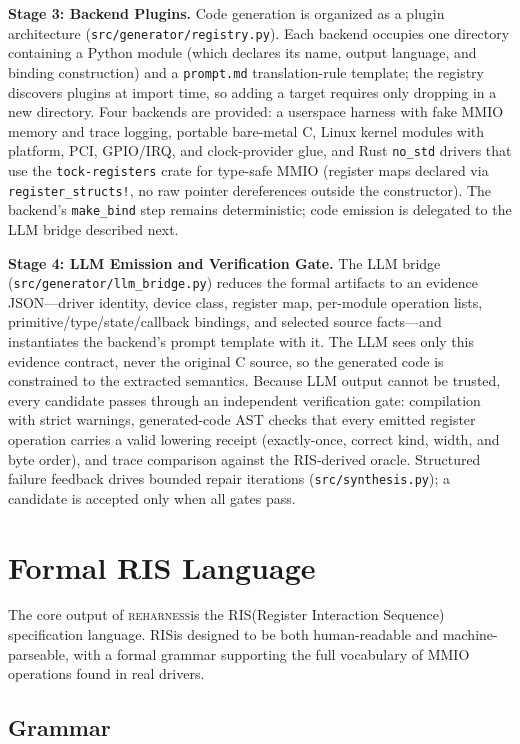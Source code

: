 \documentclass[sigplan, screen, review, anonymous]{acmart}
\newcommand{\reharness}{\textsc{reharness}}
\newcommand{\rislang}{RIS}
\begin{document}
\textbf{Stage 3: Backend Plugins.} Code generation is organized as a plugin architecture (\texttt{src/generator/registry.py}). Each backend occupies one directory containing a Python module (which declares its name, output language, and binding construction) and a \texttt{prompt.md} translation-rule template; the registry discovers plugins at import time, so adding a target requires only dropping in a new directory. Four backends are provided: a userspace harness with fake MMIO memory and trace logging, portable bare-metal C, Linux kernel modules with platform, PCI, GPIO/IRQ, and clock-provider glue, and Rust \texttt{no\_std} drivers that use the \texttt{tock-registers} crate for type-safe MMIO (register maps declared via \texttt{register\_structs!}, no raw pointer dereferences outside the constructor). The backend's \texttt{make\_bind} step remains deterministic; code emission is delegated to the LLM bridge described next.

\textbf{Stage 4: LLM Emission and Verification Gate.} The LLM bridge (\texttt{src/generator/llm\_bridge.py}) reduces the formal artifacts to an evidence JSON---driver identity, device class, register map, per-module operation lists, primitive/type/state/callback bindings, and selected source facts---and instantiates the backend's prompt template with it. The LLM sees only this evidence contract, never the original C source, so the generated code is constrained to the extracted semantics. Because LLM output cannot be trusted, every candidate passes through an independent verification gate: compilation with strict warnings, generated-code AST checks that every emitted register operation carries a valid lowering receipt (exactly-once, correct kind, width, and byte order), and trace comparison against the RIS-derived oracle. Structured failure feedback drives bounded repair iterations (\texttt{src/synthesis.py}); a candidate is accepted only when all gates pass.

\section{Formal RIS Language}

The core output of \reharness is the \rislang (Register Interaction Sequence) specification language. \rislang is designed to be both human-readable and machine-parseable, with a formal grammar supporting the full vocabulary of MMIO operations found in real drivers.

\subsection{Grammar}
\end{document}
